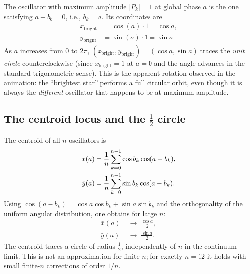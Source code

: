 \documentclass[%
 reprint, amsmath,amssymb, aps, prb, ]{revtex4-2}
\numberwithin{equation}{section}
\begin{document}
The oscillator with maximum amplitude $|P_k| = 1$ at global phase $a$ is the one satisfying $a - b_k = 0$, i.e., $b_k = a$.
Its coordinates are
\begin{align}
x_{\text{bright}} &= \cos(a) \cdot 1 = \cos a, \label{eq:xbright}\\
y_{\text{bright}} &= \sin(a) \cdot 1 = \sin a. \label{eq:ybright}
\end{align}
As $a$ increases from $0$ to $2\pi$, $(x_{\text{bright}}, y_{\text{bright}}) = (\cos a, \sin a)$ traces the \emph{unit circle} counterclockwise (since $x_{\text{bright}} = 1$ at $a = 0$ and the angle advances in the standard trigonometric sense).
This is the apparent rotation observed in the animation: the ``brightest star'' performs a full circular orbit, even though it is always the \emph{different} oscillator that happens to be at maximum amplitude.

\subsection{The centroid locus and the $\tfrac{1}{2}$ circle}
\label{subsec:centroid}

The centroid of all $n$ oscillators is
\begin{align}
\bar{x}(a) &= \frac{1}{n}\sum_{k=0}^{n-1} \cos b_k \cos(a - b_k), \label{eq:centroid_sum}\\
\bar{y}(a) &= \frac{1}{n}\sum_{k=0}^{n-1} \sin b_k \cos(a - b_k). \notag
\end{align}
Using $\cos(a - b_k) = \cos a \cos b_k + \sin a \sin b_k$ and the orthogonality of the uniform angular distribution, one obtains for large $n$:
\begin{align}
\bar{x}(a) &\;\to\; \frac{\cos a}{2}, \label{eq:centroid_x}\\
\bar{y}(a) &\;\to\; \frac{\sin a}{2}. \label{eq:centroid_y}
\end{align}
The centroid traces a circle of radius $\tfrac{1}{2}$, independently of $n$ in the continuum limit.
This is not an approximation for finite $n$; for exactly $n = 12$ it holds with small finite-$n$ corrections of order $1/n$.
\end{document}
